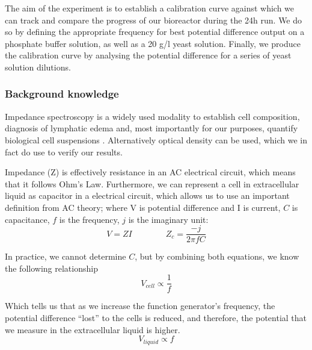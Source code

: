 The aim of the experiment is to establish a calibration curve against which we can track and compare the progress of our bioreactor during the 24h run.
We do so by defining the appropriate frequency for best potential difference output on a phosphate buffer solution, as well as a 20 g/l yeast solution.
Finally, we produce the calibration curve by analysing the potential difference for a series of yeast solution dilutions.  

\subsubsection{Background knowledge}
Impedance spectroscopy is a widely used modality to establish cell composition, diagnosis of lymphatic edema and, most importantly for our purposes, quantify biological cell suspensions \cite{LvovichVadimF2012Is, PolatAyfer2017EDoL}.
Alternatively optical density can be used, which we in fact do use to verify our results.

Impedance (Z) is effectively resistance in an AC electrical circuit, which means that it follows Ohm's Law.
Furthermore, we can represent a cell in extracellular liquid as capacitor in a electrical circuit, which allows us to use an important definition from AC theory; where V is potential difference and I is current, $C$ is capacitance, $f$ is the frequency, $j$ is the imaginary unit:
\begin{equation}
    V = ZI \quad \quad \quad \quad Z_c = \frac{-j}{2\pi f C}
\end{equation}

In practice, we cannot determine $C$, but by combining both equations, we know the following relationship
\begin{equation}
   V_{cell} \propto \frac{1}{f}
\end{equation}

Which tells us that as we increase the function generator's frequency, the potential difference ``lost'' to the cells is reduced, and therefore, the potential that we measure in the extracellular liquid is higher.
\begin{equation}
    V_{liquid} \propto f
 \end{equation}